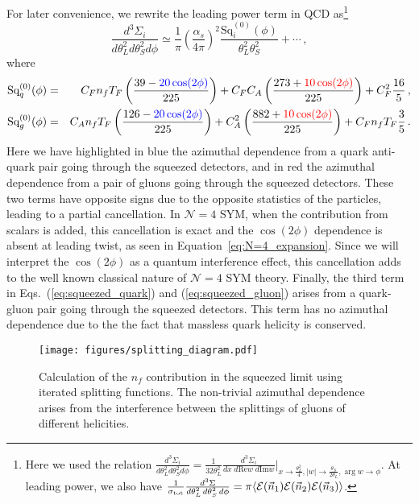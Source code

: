 \documentclass[letterpaper,11pt]{article}
\def\beq{\begin{equation}}
\def\eeq{\end{equation}}
\def\bea{\begin{eqnarray}}
\def\eea{\end{eqnarray}}
\newcommand{\Eq}[1]{Equation~\eqref{#1}}
\DeclareRobustCommand{\Eq}[1]{Eq.~(\ref{#1})}
\DeclareRobustCommand{\Eqs}[2]{Eqs.~(\ref{#1}) and (\ref{#2})}
\newcommand{\abs}[1]{\lvert#1\rvert}
\def\beq{\begin{equation}}
\def\eeq{\end{equation}}
\begin{document}
For later convenience, we rewrite the leading power term in QCD as\footnote{Here we used the relation $\frac{d^3\Sigma_i}{d\theta_L^2 d\theta_S^2 d \phi}=\frac{1}{32 \theta_L^2} \frac{d^3\Sigma_i}{d x \; d\mathrm{Re} w\; d\mathrm{Im} w}\bigg\vert_{x\to\frac{\theta_L^2}{4}, \abs{w}\to \frac{\theta_S}{2\theta_L}, \arg{w}\to \phi}$. At leading power, we also have $\frac{1}{\sigma_{\rm tot}} \frac{d^3 \Sigma}{d\theta_L^2\, d\theta_S^2\, d\phi} = \pi \langle \mathcal{E}(\vec{n}_1) \mathcal{E}(\vec{n}_2) \mathcal{E}(\vec{n}_3) \rangle$.}
\beq
 \frac{d^3 \Sigma_i}{d\theta_L^2 d\theta_S^2 d\phi} \simeq  \frac{1}{\pi}  \left(\frac{\alpha_s}{4 \pi} \right)^2   \frac{ \text{Sq}_i^{(0)}(\phi)}{\theta_L^2 \theta_S^2} +\cdots\,,
\eeq
where
\bea
 \text{Sq}^{(0)}_q (\phi)&=&C_F n_f T_F \left(  \frac{39-{\color{blue}20\cos(2\phi)}}{225} \right) 
                 +C_F C_A \left(  \frac{273+{\color{red}10\cos(2\phi)}}{225} \right)+C_F^2 \frac{16}{5}\,, \label{eq:squeezed_quark}\\
\text{Sq}^{(0)}_g (\phi) &=&C_A n_f T_F  \left(  \frac{126-{\color{blue}20\cos(2\phi)}}{225} \right)
+C_A^2 \left(  \frac{882+{\color{red}10\cos(2\phi)}}{225} \right)+C_Fn_f T_F \frac{3}{5}\,. \label{eq:squeezed_gluon}
\eea
Here we have highlighted in blue the azimuthal dependence from a quark anti-quark pair going through the squeezed detectors, and in red the azimuthal dependence from a pair of gluons going through the squeezed detectors. These two terms have opposite signs due to the opposite statistics of the particles, leading to a partial cancellation. In $\mathcal{N}=4$ SYM, when the contribution from scalars is added, this cancellation is exact and the $\cos(2\phi)$ dependence is absent at leading twist, as seen in \Eq{eq:N=4_expansion}. Since we will interpret the $\cos(2\phi)$ as a quantum interference effect, this cancellation adds to the well known classical nature of $\mathcal{N}=4$ SYM theory. Finally, the third term in \Eqs{eq:squeezed_quark}{eq:squeezed_gluon} arises from a quark-gluon pair going through the squeezed detectors. This term has no azimuthal dependence due to the the fact that massless quark helicity is conserved. 




\begin{figure}[htbp]
\begin{center}
\texttt{[image: figures/splitting\_diagram.pdf]}
\caption{Calculation of the $n_f$ contribution in the squeezed limit using iterated splitting functions. The non-trivial azimuthal dependence arises from the interference between the splittings of gluons of different helicities.}
\label{splitting_diagram}
\end{center}
\end{figure}
\end{document}
